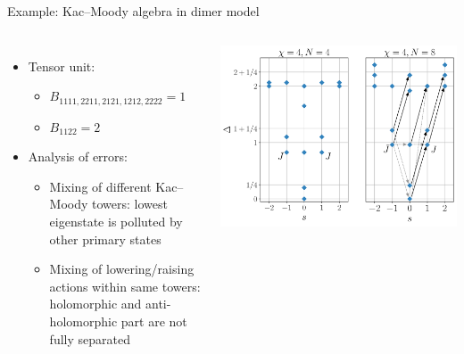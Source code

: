 \documentclass{fdubeamer}
\begin{document}
\begin{frame}{Example: Kac--Moody algebra in dimer model}

\begin{columns}[T]


    \begin{itemize}
      \item Tensor unit:

        \begin{itemize}
          \item $B_{1111,2211,2121,1212,2222} = 1$
          \item $B_{1122} = 2$
        \end{itemize}

      \item Analysis of errors:

        \begin{itemize}
          \item Mixing of different Kac--Moody towers: lowest eigenstate is polluted by other primary states
          \item Mixing of lowering/raising actions within same towers: holomorphic and anti-holomorphic part are not fully separated
        \end{itemize}
    \end{itemize}


    \vspace{1em}
    \includegraphics[width=\textwidth]{images/virasoro/dimer-spectrum.pdf}

\end{columns}


\end{frame}
\end{document}
